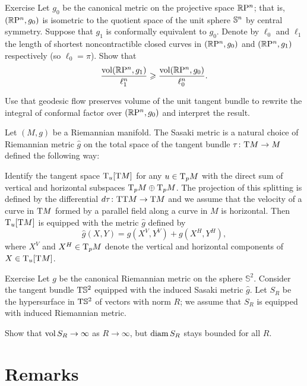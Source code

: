 \begin{thm}{Exercise}
Let $g_0$ be the canonical metric on the projective space $\mathbb{R}\mathrm{P}^n$; 
that is, $(\mathbb{R}\mathrm{P}^n,g_0)$ is isometric to the quotient space of the unit sphere $\mathbb{S}^n$ by central symmetry.
Suppose that $g_1$ is conformally equivalent to $g_0$.
Denote by $\ell_0$ and $\ell_1$ the length of shortest noncontractible closed curves in $(\mathbb{R}\mathrm{P}^n,g_0)$ and $(\mathbb{R}\mathrm{P}^n,g_1)$ respectively (so $\ell_0=\pi$).
Show that 
\[\frac{\operatorname{\rm vol}\nolimits(\mathbb{R}\mathrm{P}^n,g_1)}{\ell_1^n}\geqslant \frac{\operatorname{\rm vol}\nolimits(\mathbb{R}\mathrm{P}^n,g_0)}{\ell_0^n}.\]
\end{thm}

 Use that geodesic flow preserves volume of the unit tangent bundle to rewrite the integral of conformal factor over $(\mathbb{R}\mathrm{P}^n,g_0)$ and interpret the result.

\bigskip

Let $(M,g)$ be a Riemannian manifold.
The Sasaki metric is a natural choice of Riemannian metric $\hat g$ on the total space of the tangent bundle $\tau\colon\mathrm{T} M\to M$ defined the following way:

Identify the tangent space 
$\mathrm{T}_u[\mathrm{T} M]$ for any $u\z\in \T_p M$ with the direct sum of vertical and horizontal subspaces $\T_p M\z\oplus \T_p M$.
The projection of this splitting is defined by the differential $d\tau\colon\mathrm{T}\mathrm{T} M\to \mathrm{T} M$
and we assume that the velocity of a curve in $\mathrm{T} M$ formed by a parallel field along a curve in $M$ is horizontal.
Then $\mathrm{T}_u[\mathrm{T} M]$ is equipped with the metric $\hat g$ defined by
\[\hat g(X,Y)=g(X^V,Y^V)+g(X^H,Y^H),\]
where $X^V$ and $X^H\in\mathrm{T}_pM$ denote the vertical and horizontal components of $X\in\mathrm{T}_u[\mathrm{T} M]$.



\begin{thm}{Exercise}
Let $g$ be the canonical Riemannian metric on the sphere $\mathbb{S}^2$.
Consider the tangent bundle $\mathrm{T} \mathbb{S}^2$ 
equipped with the induced Sasaki metric $\hat g$.
Let $S_R$ be the hypersurface in $\mathrm{T} \mathbb{S}^2$ of vectors with norm $R$;
we assume that $S_R$ is equipped with induced Riemannian metric.

Show that $\operatorname{\rm vol}\nolimits S_R\to \infty$ as $R\to\infty$,
but $\operatorname{\rm diam}\nolimits S_R$ stays bounded for all $R$.
\end{thm}



\section{Remarks}

